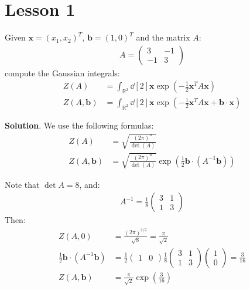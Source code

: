 \documentclass[../template.tex]{subfiles}
\begin{document}
\chapter{Lesson 1}
\begin{exo}
    Given $\bm{x} = (x_1,x_2)^T$, $\bm{b} = (1,0)^T$ and the matrix $A$:
    \begin{align*}
        A = \left(\begin{array}{cc}
        3 & -1 \\ 
        -1 & 3
        \end{array}\right)
    \end{align*}   
    compute the Gaussian integrals:
    \begin{align*}
        Z(A) &= \int_{\mathbb{R}^2} \dd[2]{\bm{x}} \exp\left(-\frac{1}{2} \bm{x}^T A \bm{x} \right) \\
        Z(A,\bm{b}) &= \int_{\mathbb{R}^2} \dd[2]{\bm{x}} \exp\left(-\frac{1}{2} \bm{x}^T A \bm{x} + \bm{b}\cdot \bm{x} \right)
    \end{align*}

    \medskip

    \textbf{Solution}. We use the following formulas:
    \begin{align*}
        Z(A) &= \sqrt{\frac{(2 \pi)^n}{\operatorname{det}(A)}}\\
        Z(A,\bm{b}) &= \sqrt{\frac{(2 \pi)^n}{\operatorname{det}(A)}} \exp\left(\frac{1}{2} \bm{b}\cdot (A^{-1}\bm{b}) \right)
    \end{align*}
   
    Note that $\operatorname{det}A = 8$, and:
    \begin{align*}
        A^{-1} = \frac{1}{8} \left(\begin{array}{cc}
        3 & 1 \\ 
        1 & 3
        \end{array}\right) 
    \end{align*} 
    Then:
    \begin{align*}
        Z(A,0) &= \frac{(2\pi)^{2/2}}{\sqrt{8}} = \frac{\pi}{\sqrt{2}} \\
        \frac{1}{2} \bm{b}\cdot (A^{-1}\bm{b}) &=  \frac{1}{2} \left(\begin{array}{cc}
        1 & 0
        \end{array}\right) \frac{1}{8} \left(\begin{array}{cc}
        3 & 1 \\ 
        1 & 3
        \end{array}\right) \left(\begin{array}{c}
        1 \\ 
        0
        \end{array}\right) = \frac{3}{16} \\
        Z(A, \bm{b}) &= \frac{\pi}{\sqrt{2}} \exp\left(\frac{3}{16} \right)   
    \end{align*}
\end{exo}
\end{document}
